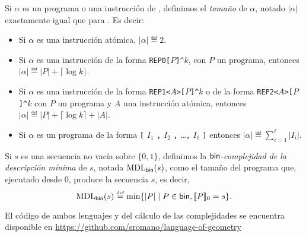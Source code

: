 Si $\alpha$ es un programa o una instrucción de \grambin, definimos el {\em tamaño} de $\alpha$, notado $|\alpha|$ exactamente igual que para \grambin. Es decir:
%
\begin{itemize}
\item Si $\alpha$ es una instrucción atómica, $|\alpha|\eqdef 2$.

\item Si $\alpha$ es una instrucción de la forma 
\verb#REP0[#$P$\verb#]^#$k$, con $P$ un programa, 
entonces $|\alpha|\eqdef |P|+\lceil \log k\rceil$.

\item Si $\alpha$ es una instrucción de la forma 
\verb#REP1<#$A$\verb#>[#$P$\verb#]^#$k$ o de la forma 
\verb#REP2<#$A$\verb#>[#$P$\verb#]^#$k$ 
con $P$ un programa y $A$ una instrucción atómica, 
entonces $|\alpha|\eqdef |P|+\lceil \log k\rceil+|A|$.

\item Si $\alpha$ es un programa de la forma
\verb#[# $I_1$ \verb#,# $I_2$ \verb#,# \dots \verb#,# $I_\ell$ \verb#]#
entonces $|\alpha|\eqdef \sum_{i=1}^\ell|I_i|$.
\end{itemize}
%
Si $s$ es una secuencia no vacía sobre $\{0,1\}$, definimos la {\em ${\sf bin}$-complejidad de la descripción mínima} de $s$, notada ${\rm MDL}_{{\sf bin}}(s)$, como el tamaño del programa que, ejecutado desde 0, produce la secuencia $s$, es decir,
$$
{\rm MDL}_{{\sf bin}}(s)\stackrel{\scriptscriptstyle \mathrm{def}}{=}\min\{|P|\mid P\in{\sf bin},\llbracket P\rrbracket_0=s\}.
$$


El código de ambos lenguajes y del cálculo de las complejidades se encuentra disponible en \hyperref[https://github.com/sromano/language-of-geometry]{\url{https://github.com/sromano/language-of-geometry}}

\renewcommand{\thetable}{\arabic{chapter}.\arabic{figure}}
\renewcommand{\thefigure}{\arabic{chapter}.\arabic{figure}}